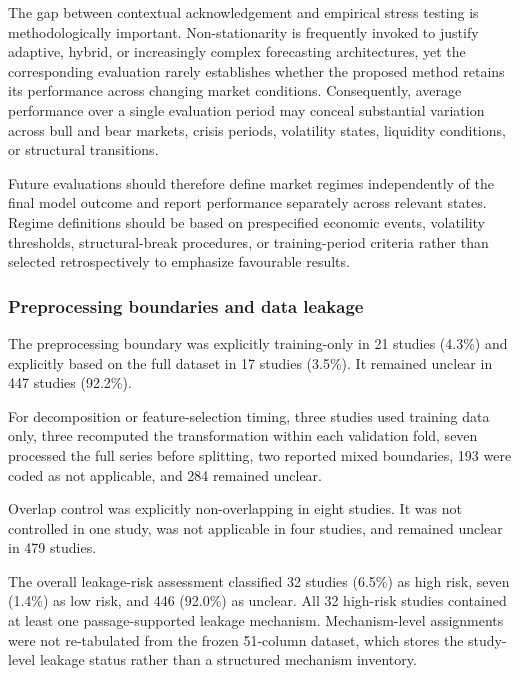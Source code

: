 \documentclass[pdflatex,sn-mathphys-num]{sn-jnl}%
\theoremstyle{thmstyleone}%
\theoremstyle{thmstyletwo}%
\theoremstyle{thmstylethree}%
\begin{document}
The gap between contextual acknowledgement and empirical stress testing is
methodologically important. Non-stationarity is frequently invoked to justify
adaptive, hybrid, or increasingly complex forecasting architectures, yet the
corresponding evaluation rarely establishes whether the proposed method
retains its performance across changing market conditions. Consequently,
average performance over a single evaluation period may conceal substantial
variation across bull and bear markets, crisis periods, volatility states,
liquidity conditions, or structural transitions.

Future evaluations should therefore define market regimes independently of
the final model outcome and report performance separately across relevant
states. Regime definitions should be based on prespecified economic events,
volatility thresholds, structural-break procedures, or training-period
criteria rather than selected retrospectively to emphasize favourable
results.

\subsubsection{Preprocessing boundaries and data leakage}
\label{subsubsec:leakage-audit}

The preprocessing boundary
\cite{P00035,P00037,P00050,P00059,P00088,P00114,P00140,P00213}
was explicitly training-only in 21 studies (4.3\%) and explicitly based on
the full dataset in 17 studies (3.5\%). It remained unclear in 447 studies
(92.2\%).

For decomposition or feature-selection timing, three studies used training
data only, three recomputed the transformation within each validation fold,
seven processed the full series before splitting, two reported mixed
boundaries, 193 were coded as not applicable, and 284 remained unclear.

Overlap control was explicitly non-overlapping in eight studies. It was not
controlled in one study, was not applicable in four studies, and remained
unclear in 479 studies.

The overall leakage-risk assessment
\cite{P00019,P00022,P00061,P00157,P00162,P00176,P00178}
classified 32 studies (6.5\%) as high risk, seven (1.4\%) as low risk, and
446 (92.0\%) as unclear. All 32 high-risk studies contained at least one
passage-supported leakage mechanism. Mechanism-level assignments were not re-tabulated from the frozen 51-column dataset, which stores the study-level leakage status rather than a structured mechanism inventory.
\end{document}
